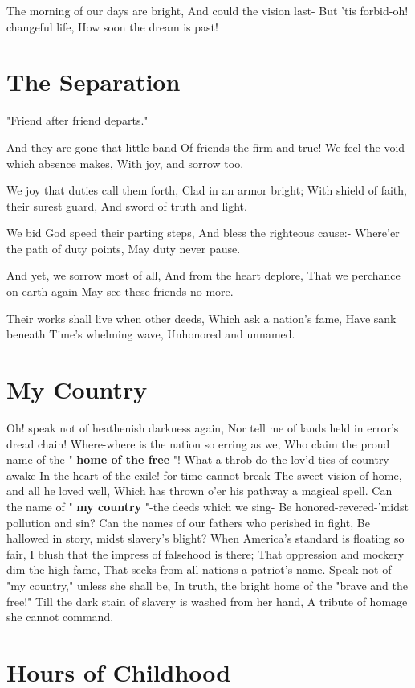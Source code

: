 \documentclass[11pt,a4paper]{article}
\begin{document}
The morning of our days are bright,
And could the vision last-
But 'tis forbid-oh! changeful life,
How soon the dream is past!

\section{The Separation}

"Friend after friend departs."

And they are gone-that little band
Of friends-the firm and true!
We feel the void which absence makes,
With joy, and sorrow too.

We joy that duties call them forth,
Clad in an armor bright;
With shield of faith, their surest guard,
And sword of truth and light.

We bid God speed their parting steps,
And bless the righteous cause:-
Where'er the path of duty points,
May duty never pause.

And yet, we sorrow most of all,
And from the heart deplore,
That we perchance on earth again
May see these friends no more.

Their works shall live when other deeds,
Which ask a nation's fame,
Have sank beneath Time's whelming wave,
Unhonored and unnamed.

\section{My Country}

Oh! speak not of heathenish darkness again,
Nor tell me of lands held in error's dread chain!
Where-where is the nation so erring as we,
Who claim the proud name of the " \textbf{home of the free} "!
What a throb do the lov'd ties of country awake
In the heart of the exile!-for time cannot break
The sweet vision of home, and all he loved well,
Which has thrown o'er his pathway a magical spell.
Can the name of " \textbf{my country} "-the deeds which we sing-
Be honored-revered-'midst pollution and sin?
Can the names of our fathers who perished in fight,
Be hallowed in story, midst slavery's blight?
When America's standard is floating so fair,
I blush that the impress of falsehood is there;
That oppression and mockery dim the high fame,
That seeks from all nations a patriot's name.
Speak not of "my country," unless she shall be,
In truth, the bright home of the "brave and the free!"
Till the dark stain of slavery is washed from her hand,
A tribute of homage she cannot command.

\section{Hours of Childhood}
\end{document}

